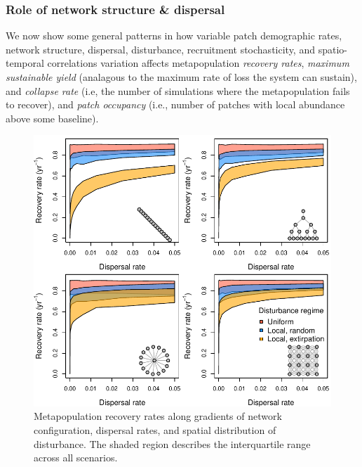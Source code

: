 \documentclass[
]{article}
\begin{document}
\hypertarget{role-of-network-structure-dispersal}{%
\subsubsection{Role of network structure \&
dispersal}\label{role-of-network-structure-dispersal}}

We now show some general patterns in how variable patch demographic
rates, network structure, dispersal, disturbance, recruitment
stochasticity, and spatio-temporal correlations variation affects
metapopulation \emph{recovery rates}, \emph{maximum sustainable yield}
(analagous to the maximum rate of loss the system can sustain), and
\emph{collapse rate} (i.e, the number of simulations where the
metapopulation fails to recover), and \emph{patch occupancy} (i.e.,
number of patches with local abundance above some baseline).

\begin{figure}[H]

{\centering \includegraphics{Managing_for_ecological_surprises_in_metapopulations_files/figure-latex/recovery and dispersal and spatial network-1} 

}

\caption{Metapopulation recovery rates along gradients of network configuration, dispersal rates, and spatial distribution of disturbance. The shaded region describes the interquartile range across all scenarios.}\label{fig:recovery and dispersal and spatial network}
\end{figure}
\end{document}
